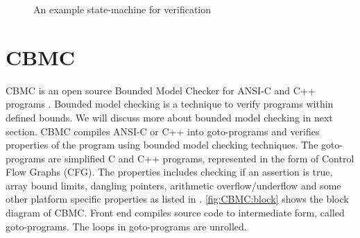 \begin{figure}[htbp]
   \centering
   \caption{An example state-machine for verification}
   \label{fig:example:statemachine}
\end{figure}


\section{CBMC}  \label{sec:back:cbmc}

CBMC is an open source Bounded Model Checker for ANSI-C and C++ programs \cite{website:cprover:cbmc}. Bounded model checking is a technique to verify programs within defined bounds. We will discuss more about bounded model checking in next section. CBMC compiles ANSI-C or C++ into goto-programs and verifies properties of the program using bounded model checking techniques. The goto-programs are simplified C and C++ programs, represented in the form of Control Flow Graphs (CFG). The properties includes checking if an assertion is true, array bound limits, dangling pointers, arithmetic overflow/underflow and some other platform specific properties as listed in \cite{website:cprover:cbmc}. \autoref{fig:CBMC:block} shows the block diagram of CBMC. Front end compiles source code to intermediate form, called goto-programs. The loops in goto-programs are unrolled.


